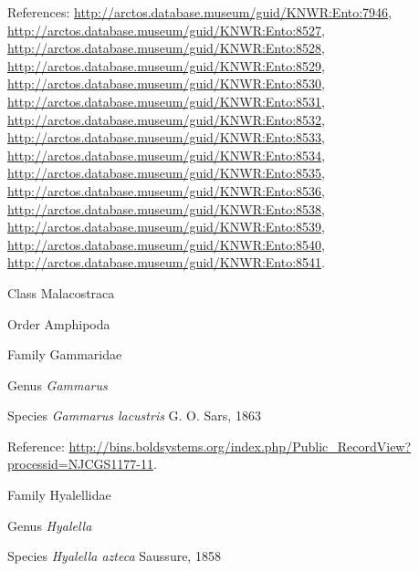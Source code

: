 \documentclass[9pt, article]{memoir}
\begin{document}
\begin{multicols}{2}
\vspace{6pt}References: 
\url{http://arctos.database.museum/guid/KNWR:Ento:7946}, 
\url{http://arctos.database.museum/guid/KNWR:Ento:8527}, 
\url{http://arctos.database.museum/guid/KNWR:Ento:8528}, 
\url{http://arctos.database.museum/guid/KNWR:Ento:8529}, 
\url{http://arctos.database.museum/guid/KNWR:Ento:8530}, 
\url{http://arctos.database.museum/guid/KNWR:Ento:8531}, 
\url{http://arctos.database.museum/guid/KNWR:Ento:8532}, 
\url{http://arctos.database.museum/guid/KNWR:Ento:8533}, 
\url{http://arctos.database.museum/guid/KNWR:Ento:8534}, 
\url{http://arctos.database.museum/guid/KNWR:Ento:8535}, 
\url{http://arctos.database.museum/guid/KNWR:Ento:8536}, 
\url{http://arctos.database.museum/guid/KNWR:Ento:8538}, 
\url{http://arctos.database.museum/guid/KNWR:Ento:8539}, 
\url{http://arctos.database.museum/guid/KNWR:Ento:8540}, 
\url{http://arctos.database.museum/guid/KNWR:Ento:8541}.

\vspace{6pt}\noindent\hspace{12pt}Class Malacostraca


\vspace{6pt}\noindent\hspace{18pt}Order Amphipoda


\vspace{6pt}\noindent\hspace{24pt}Family Gammaridae


\vspace{6pt}\noindent\hspace{30pt}Genus \textit{Gammarus}


\vspace{6pt}\noindent\hspace{36pt}Species \textit{Gammarus lacustris} G. O. Sars, 1863


\vspace{6pt}Reference: 
\url{http://bins.boldsystems.org/index.php/Public_RecordView?processid=NJCGS1177-11}.

\vspace{6pt}\noindent\hspace{24pt}Family Hyalellidae


\vspace{6pt}\noindent\hspace{30pt}Genus \textit{Hyalella}


\vspace{6pt}\noindent\hspace{36pt}Species \textit{Hyalella azteca} Saussure, 1858



\end{multicols}
\end{document}
